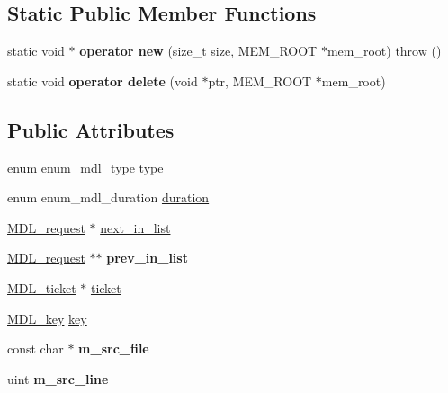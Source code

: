 \subsection*{Static Public Member Functions}
\begin{DoxyCompactItemize}
\item 
\mbox{\label{classMDL__request_a46c82cd2ca417fc6f1b9c63c71e47889}} 
static void $\ast$ {\bfseries operator new} (size\+\_\+t size, M\+E\+M\+\_\+\+R\+O\+OT $\ast$mem\+\_\+root)  throw ()
\item 
\mbox{\label{classMDL__request_a6fed43bd7ebb8e9b356a1732dd274416}} 
static void {\bfseries operator delete} (void $\ast$ptr, M\+E\+M\+\_\+\+R\+O\+OT $\ast$mem\+\_\+root)
\end{DoxyCompactItemize}
\subsection*{Public Attributes}
\begin{DoxyCompactItemize}
\item 
enum enum\+\_\+mdl\+\_\+type \mbox{\hyperlink{classMDL__request_a13f9ecefea91a5355e694339ed9f7943}{type}}
\item 
enum enum\+\_\+mdl\+\_\+duration \mbox{\hyperlink{classMDL__request_a1bbba71916cc45c7a3912175ef76cf69}{duration}}
\item 
\mbox{\hyperlink{classMDL__request}{M\+D\+L\+\_\+request}} $\ast$ \mbox{\hyperlink{classMDL__request_ad9d3b3f440b67b7665b3a2701a14e2b2}{next\+\_\+in\+\_\+list}}
\item 
\mbox{\label{classMDL__request_a9e7ba7a3d2a1b9374f0dbe0be197854a}} 
\mbox{\hyperlink{classMDL__request}{M\+D\+L\+\_\+request}} $\ast$$\ast$ {\bfseries prev\+\_\+in\+\_\+list}
\item 
\mbox{\hyperlink{classMDL__ticket}{M\+D\+L\+\_\+ticket}} $\ast$ \mbox{\hyperlink{classMDL__request_a99421002fe2ea1580766846c0ef339ae}{ticket}}
\item 
\mbox{\hyperlink{structMDL__key}{M\+D\+L\+\_\+key}} \mbox{\hyperlink{classMDL__request_ab30e06e36d9191120575cc0c0402554a}{key}}
\item 
\mbox{\label{classMDL__request_aa55387aeb49a4f81ecaa87fd481a310b}} 
const char $\ast$ {\bfseries m\+\_\+src\+\_\+file}
\item 
\mbox{\label{classMDL__request_aeb5f59ed9b9bfa377f8f4afab470653b}} 
uint {\bfseries m\+\_\+src\+\_\+line}
\end{DoxyCompactItemize}


